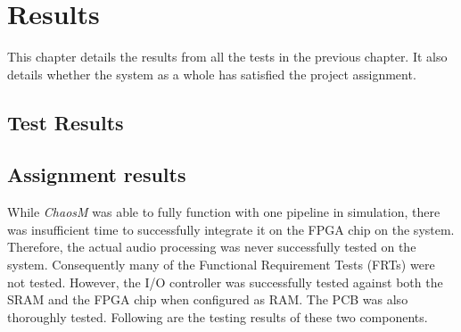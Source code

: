 \chapter{Results}\label{chapter:results}

This chapter details the results from all the tests in the previous chapter. It
also details whether the system as a whole has satisfied the project assignment.


\clearpage
\section{Test Results}



\clearpage


\clearpage


\clearpage
\section{Assignment results}

While \textit{ChaosM} was able to fully function with one pipeline in
simulation, there was insufficient time to successfully integrate it on the FPGA
chip on the system. Therefore, the actual audio processing was never
successfully tested on the system. Consequently many of the Functional
Requirement Tests (FRTs) were not tested. However, the I/O controller was
successfully tested against both the SRAM and the FPGA chip when configured as
RAM. The PCB was also thoroughly tested. Following are the testing results of
these two components.




